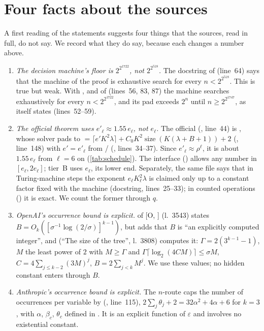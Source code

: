 \documentclass[10pt]{amsart}
\theoremstyle{definition}
\theoremstyle{remark}
\numberwithin{equation}{section}
\newcommand{\Oa}[1][]{\textup{[O\if\relax\detokenize{#1}\relax\else, #1\fi]}}
\newcommand{\sz}{\operatorname{size}}
\begin{document}
\section{Four facts about the sources}\label{sec:corrections}
A first reading of the statements suggests four things that the sources, read in full, do not
say. We record what they do say, because each changes a number above.

\begin{enumerate}[label=\textup{(\arabic*)}]
\item \emph{The decision machine's floor is $2^{2^{1722}}$, not $2^{2^{518}}$.} The docstring of
 (line~64) says that the machine of the proof is
exhaustive search for every $n<2^{2^{518}}$. This is true but weak. With ,  and
 of  (lines~56, 83, 87) the machine searches
exhaustively for every $n<2^{2^{1722}}$, and its pad exceeds $2^n$ until $n\ge2^{2^{1747}}$, as
 itself states (lines~52--59).
\item \emph{The official theorem uses $e'_\ell\approx1.55\,e_\ell$, not $e_\ell$.} The official
 (, line~44) is ,
whose solver  pads to $=\lceil e'K^2\lambda\rceil+C_0K^2\sz(K(\lambda+B+1))+2$
(, line~148) with $e'=e'_\ell$ from /
(, lines~34--37). Since $e'_\ell\approx\rho^\ell$, it is
about $1.55\,e_\ell$ from $\ell=6$ on (\cref{tab:schedule}). The interface 
() allows any number in $[e_\ell,2e_\ell]$; tier~B uses
$e_\ell$, its lower end. Separately, the same file says that in Turing-machine steps the exponent
$e_\ell K_\ell^2\lambda$ is claimed only up to a constant factor fixed with the machine (docstring,
lines~25--33); in counted operations () it is exact. We count the former through
$q$.
\item \emph{OpenAI's occurrence bound is explicit.}  of \Oa{} (l.~3543) states
$B=O_k([\sigma^{-1}\log(2/\sigma)]^{k-1})$, but adds that $B$ is ``an explicitly computed integer'',
and  (``The size of the tree'', l.~3808) computes it: $\Gamma=2(3^{k-1}-1)$, $M$
the least power of $2$ with $M\ge\Gamma$ and $\Gamma\lceil\log_2(4CM)\rceil\le\sigma M$,
$C=4\sum_{j\le k-2}(3M)^j$, $B=2\sum_{j<k}M^j$. We use these values; no hidden constant enters
through $B$.
\item \emph{Anthropic's occurrence bound is explicit.} The $n$-route caps the number of
occurrences per variable by  (, line~115),
$2\sum_j\theta_j+2=32\alpha^2+4\alpha+6$ for $k=3$, with $\alpha$, $\beta_c$, $\theta_c$ defined in
. It is an explicit function of $\varepsilon$
and involves no existential constant.
\end{enumerate}
\end{document}
